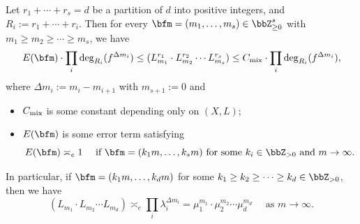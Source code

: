   \begin{proposition}\label{prop:estimation_of_mixed_degrees}
    Let $r_1 + \cdots + r_s = d$ be a partition of $d$ into positive integers, and $R_i := r_1 + \cdots + r_i$.
    Then for every $\bfm = (m_1, \ldots, m_s) \in \bbZ_{\geq 0}^s$ with $m_1 \geq m_2 \geq \cdots \geq m_s$, we have
    \[ E(\bfm) \cdot \prod_i \deg_{R_i}(f^{\Delta m_i}) \leq (L_{m_1}^{r_1} \cdot L_{m_2}^{r_2} \cdots L_{m_s}^{r_s}) \leq C_{\mix} \cdot \prod_i \deg_{R_i}(f^{\Delta m_i}), \]
    where $\Delta m_i := m_i - m_{i+1}$ with $m_{s+1} := 0$ and
    \begin{itemize}
      \item $C_{\text{mix}}$ is some constant depending only on $(X,L)$;
      \item $E(\bfm)$ is some error term satisfying 
      \[ E(\bfm) \asymp_e 1 \quad \text{ if } \bfm = (k_1m, \ldots, k_sm) \text{ for some } k_i \in \bbZ_{>0} \text{ and } m \to \infty. \]
    \end{itemize}
    In particular, if $\bfm = (k_1m, \ldots, k_dm)$ for some $k_1 \geq k_2 \geq \cdots \geq k_d \in \bbZ_{>0}$, then we have
    \[ (L_{m_1} \cdot L_{m_2} \cdots L_{m_d}) \asymp_e \prod_i \lambda_{i}^{\Delta m_i} = \mu_1^{m_1} \cdot \mu_2^{m_2} \cdots \mu_d^{m_d} \quad \text{ as } m \to \infty. \]
  \end{proposition}
